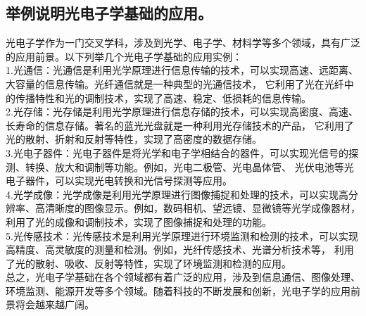 \documentclass[12pt, a4paper, oneside]{article}
\begin{document}
\begin{spacing}{2.0}
\section{举例说明光电子学基础的应用。}
光电子学作为一门交叉学科，涉及到光学、电子学、材料学等多个领域，具有广泛的应用前景。以下列举几个光电子学基础的应用实例：
\\
1.光通信：光通信是利用光学原理进行信息传输的技术，可以实现高速、远距离、大容量的信息传输。光纤通信就是一种典型的光通信技术，
它利用了光在光纤中的传播特性和光的调制技术，实现了高速、稳定、低损耗的信息传输。
\\
2.光存储：光存储是利用光学原理进行信息存储的技术，可以实现高密度、高速、长寿命的信息存储。著名的蓝光光盘就是一种利用光存储技术的产品，
它利用了光的散射、折射和反射等特性，实现了高密度的数据存储。
\\
3.光电子器件：光电子器件是将光学和电子学相结合的器件，可以实现光信号的探测、转换、放大和调制等功能。例如，光电二极管、光电晶体管、
光伏电池等光电子器件，可以实现光电转换和光信号探测等应用。
\\
4.光学成像：光学成像是利用光学原理进行图像捕捉和处理的技术，可以实现高分辨率、高清晰度的图像显示。例如，数码相机、望远镜、显微镜等光学成像器材，
利用了光的成像和调制技术，实现了图像捕捉和处理的功能。
\\
5.光传感技术：光传感技术是利用光学原理进行环境监测和检测的技术，可以实现高精度、高灵敏度的测量和检测。例如，光纤传感技术、光谱分析技术等，
利用了光的散射、吸收、反射等特性，实现了环境监测和检测的应用。
\\
总之，光电子学基础在各个领域都有着广泛的应用，涉及到信息通信、图像处理、环境监测、能源开发等多个领域。随着科技的不断发展和创新，光电子学的应用前景将会越来越广阔。





\end{spacing}
\end{document}
